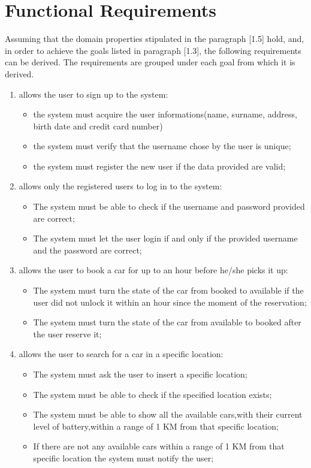 \section{Functional Requirements}
Assuming that the domain properties stipulated in the paragraph [1.5] hold, and, in order to achieve the goals listed in paragraph [1.3], the following requirements can be derived. The requirements are grouped under each goal from which it is derived.

\begin{enumerate}
\item allows the user to sign up to the system:

\begin{itemize}
\item the system must acquire the user informations(name, surname, address, birth date and credit card number)
\item the system must verify that the username chose by the user is unique;
\item the system must register the new user if the data provided are valid;
\end{itemize}

\item allows only the registered users to log in to the system:

\begin{itemize}
\item The system must be able to check if the username and password provided are correct;
\item The system must let the user login if and only if the provided username and the password are correct;
\end{itemize}

\item allows the user to book a car for up to an hour before he/she picks it up:

\begin{itemize}
\item The system must turn the state of the car from booked to available if the user did not unlock it within an hour since the moment of the reservation;
\item The system must turn the state of the car from available to booked after the user reserve it;
\end{itemize}

\item allows the user to search for a car in a specific location:

\begin{itemize}
\item The system must ask the user to insert a specific location;
\item The system must be able to check if the specified location exists;
\item The system must be able to show all the available cars,with their current level of battery,within a range of 1 KM from that specific location;
\item If there are not any available cars within a range of 1 KM from that specific location the system must notify the user;
\end{itemize}


\end{enumerate}
